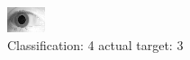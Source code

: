 \begin{figure}[h!]
\begin{center}
\includegraphics[width=0.60\columnwidth]{figures/ID1844_class_4_target_3.png}
\end{center}
\caption{ Classification: 4 actual target: 3}
\label{fig:ID1844_class_4_target_3}
\end{figure}
